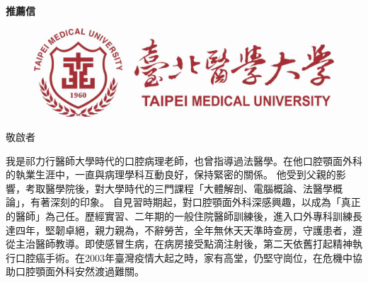 \documentclass{letter}
\date{}
\begin{document}
\begin{letter}
{
\centering \Large \textbf{推薦信}%
}

\hfill
\begin{figure}%
    \includegraphics[width=0.2\textheight]{TMU_logo.jpg}
\end{figure}

\opening{敬啟者} %
\medskip 

\indent 我是祁力行醫師大學時代的口腔病理老師，也曾指導過法醫學。在他口腔顎面外科的執業生涯中，一直與病理學科互動良好，保持緊密的關係。
他受到父親的影響，考取醫學院後，對大學時代的三門課程「大體解剖、電腦概論、法醫學概論」，有著深刻的印象。
自見習時期起，對口腔顎面外科深感興趣，以成為「真正的醫師」為己任。歷經實習、二年期的一般住院醫師訓練後，進入口外專科訓練長達四年，堅韌卓絕，親力親為，不辭勞苦，全年無休天天準時查房，守護患者，遵從主治醫師教導。即使感冒生病，在病房接受點滴注射後，第二天依舊打起精神執行口腔癌手術。在2003年臺灣疫情大起之時，家有高堂，仍堅守崗位，在危機中協助口腔顎面外科安然渡過難關。



\end{letter}
\end{document}
